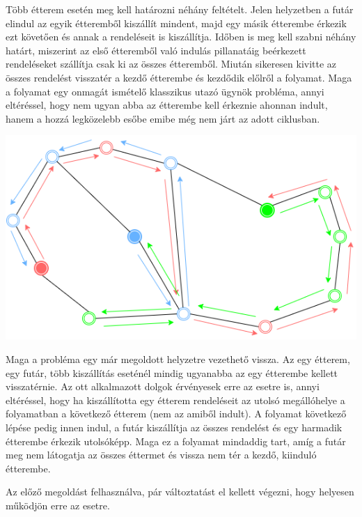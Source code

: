 

Több étterem esetén meg kell határozni néhány feltételt. Jelen helyzetben a futár elindul az egyik étteremből kiszállít mindent, majd egy másik étterembe érkezik ezt követően és annak a rendeléseit is kiszállítja. Időben is meg kell szabni néhány határt, miszerint az első étteremből való indulás pillanatáig beérkezett rendeléseket szállítja csak ki az összes étteremből. Miután sikeresen kivitte az összes rendelést visszatér a kezdő étterembe és kezdődik előlről a folyamat. Maga a folyamat egy onmagát ismételő klasszikus utazó ügynök probléma, annyi eltéréssel, hogy nem ugyan abba az étterembe kell érkeznie ahonnan indult, hanem a hozzá legközelebb esőbe emibe még nem járt az adott ciklusban.

\includegraphics[scale=0.6]{images/Circulartsp.png}


Maga a probléma egy már megoldott helyzetre vezethető vissza. Az egy étterem, egy futár, több kiszállítás eseténél mindig ugyanabba az egy étterembe kellett visszatérnie. Az ott alkalmazott dolgok érvényesek erre az esetre is, annyi eltéréssel, hogy ha kiszállította egy étterem rendeléseit az utolsó megállóhelye a folyamatban a következő étterem (nem az amiből indult). A folyamat következő lépése pedig innen indul, a futár kiszállítja az összes rendelést és egy harmadik étterembe érkezik utolsóképp. Maga ez a folyamat mindaddig tart, amíg a futár meg nem látogatja az összes éttermet és vissza nem tér a kezdő, kiinduló étterembe. 


Az előző megoldást felhasználva, pár változtatást el kellett végezni, hogy helyesen működjön erre az esetre.

